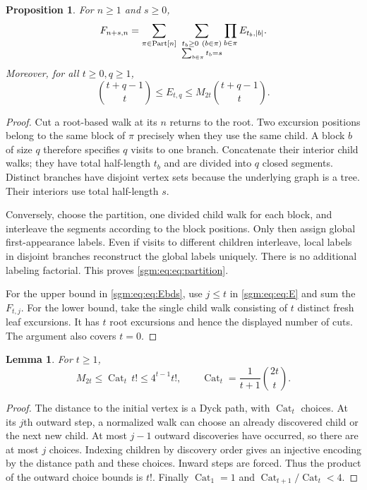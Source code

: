 \documentclass[11pt,letterpaper]{article}
\newtheorem{lemma}[theorem]{Lemma}\newtheorem{proposition}[theorem]{Proposition}\newtheorem{corollary}[theorem]{Corollary}
\theoremstyle{remark}\newtheorem{remark}[theorem]{Remark}
\newcommand{\Cat}{\operatorname{Cat}}\newcommand{\E}{\mathbb E}\newcommand{\Prob}{\mathbb P}\newcommand{\ind}{\mathbf 1}
\theoremstyle{definition}\newtheorem{definition}[theorem]{Definition}
\begin{document}
\begin{proposition}\label{sgm:eq:prop:partition}
For $n\ge1$ and $s\ge0$,
\begin{equation}\label{sgm:eq:eq:partition}
 F_{n+s,n}=\sum_{\pi\in\Part[n]}\ \sum_{\substack{t_b\ge0\ (b\in\pi)\\\sum_{b\in\pi}t_b=s}}
       \prod_{b\in\pi}E_{t_b,|b|}.
\end{equation}
Moreover, for all $t\ge0,q\ge1$,
\begin{equation}\label{sgm:eq:eq:Ebds}
 \binom{t+q-1}{t}\le E_{t,q}
 \le M_{2t}\binom{t+q-1}{t}.
\end{equation}
\end{proposition}
\begin{proof}
Cut a root-based walk at its $n$ returns to the root. Two excursion positions belong to the same block of $\pi$ precisely when they use the same child. A block $b$ of size $q$ therefore specifies $q$ visits to one branch. Concatenate their interior child walks; they have total half-length $t_b$ and are divided into $q$ closed segments. Distinct branches have disjoint vertex sets because the underlying graph is a tree. Their interiors use total half-length $s$.

Conversely, choose the partition, one divided child walk for each block, and interleave the segments according to the block positions. Only then assign global first-appearance labels. Even if visits to different children interleave, local labels in disjoint branches reconstruct the global labels uniquely. There is no additional labeling factorial. This proves \eqref{sgm:eq:eq:partition}.

For the upper bound in \eqref{sgm:eq:eq:Ebds}, use $j\le t$ in \eqref{sgm:eq:eq:E} and sum the $F_{t,j}$. For the lower bound, take the single child walk consisting of $t$ distinct fresh leaf excursions. It has $t$ root excursions and hence the displayed number of cuts. The argument also covers $t=0$.
\end{proof}

\begin{lemma}\label{sgm:eq:lem:elementary}
For $t\ge1$,
\begin{equation}\label{sgm:eq:eq:roughM}
 M_{2t}\le\Cat_t\,t!\le4^{t-1}t!,
 \qquad \Cat_t=\frac1{t+1}\binom{2t}{t}.
\end{equation}
\end{lemma}
\begin{proof}
The distance to the initial vertex is a Dyck path, with $\Cat_t$ choices. At its $j$th outward step, a normalized walk can choose an already discovered child or the next new child. At most $j-1$ outward discoveries have occurred, so there are at most $j$ choices. Indexing children by discovery order gives an injective encoding by the distance path and these choices. Inward steps are forced. Thus the product of the outward choice bounds is $t!$. Finally $\Cat_1=1$ and $\Cat_{t+1}/\Cat_t<4$.
\end{proof}
\end{document}
